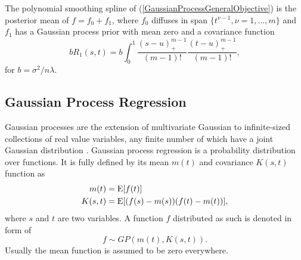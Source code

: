 \begin{theorem}\cite{gu2013smoothing}
The polynomial smoothing spline of (\ref{GaussianProcessGeneralObjective}) is the posterior mean of $f = f_0 +f_1$, where $f_0$ diffuses in span $\{t^{\nu-1}, \nu= 1, \ldots , m\}$ and $f_1$ has a Gaussian process prior with mean zero and a covariance function
\begin{equation*}
bR_1(s,t) = b\int_{0}^{1} \frac{(s-u)_+^{m-1}}{(m-1)!} \frac{(t-u)_+^{m-1}}{(m-1)!},
\end{equation*}
for $b=\sigma^2/n\lambda$. 
\end{theorem}



\subsection{Gaussian Process Regression}

Gaussian processes are the extension of multivariate Gaussian to infinite-sized collections of real value variables, any finite number of which have a joint Gaussian distribution \cite{rasmussen2006gaussian}. Gaussian process regression is a probability distribution over functions. It is fully defined by its mean $m(t)$ and covariance $K(s,t)$ function as 
\begin{align*}
m(t)&=\mathrm{E} [f(t)] \\
K(s,t)&=\mathrm{E} \lbrack (f(s)-m(s)) (f(t)-m(t))\rbrack,
\end{align*}
where $s$ and $t$ are two variables. A function $f$ distributed as such is denoted in form of 
\begin{equation*}
f \sim GP(m(t),K(s,t)).
\end{equation*}
Usually the mean function is assumed to be zero everywhere. 

